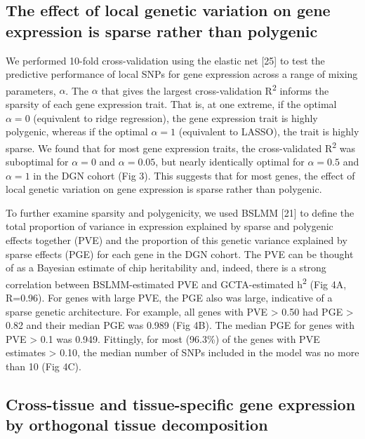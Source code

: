 \documentclass[]{article}
\begin{document}
\subsection{The effect of local genetic variation on gene expression is
sparse rather than
polygenic}\label{the-effect-of-local-genetic-variation-on-gene-expression-is-sparse-rather-than-polygenic}

We performed 10-fold cross-validation using the elastic net {[}25{]} to
test the predictive performance of local SNPs for gene expression across
a range of mixing parameters, \(\alpha\). The \(\alpha\) that gives the
largest cross-validation R\textsuperscript{2} informs the sparsity of
each gene expression trait. That is, at one extreme, if the optimal
\(\alpha=0\) (equivalent to ridge regression), the gene expression trait
is highly polygenic, whereas if the optimal \(\alpha=1\) (equivalent to
LASSO), the trait is highly sparse. We found that for most gene
expression traits, the cross-validated R\textsuperscript{2} was
suboptimal for \(\alpha=0\) and \(\alpha=0.05\), but nearly identically
optimal for \(\alpha=0.5\) and \(\alpha=1\) in the DGN cohort (Fig 3).
This suggests that for most genes, the effect of local genetic variation
on gene expression is sparse rather than polygenic.

To further examine sparsity and polygenicity, we used BSLMM {[}21{]} to
define the total proportion of variance in expression explained by
sparse and polygenic effects together (PVE) and the proportion of this
genetic variance explained by sparse effects (PGE) for each gene in the
DGN cohort. The PVE can be thought of as a Bayesian estimate of chip
heritability and, indeed, there is a strong correlation between
BSLMM-estimated PVE and GCTA-estimated h\textsuperscript{2} (Fig 4A,
R=0.96). For genes with large PVE, the PGE also was large, indicative of
a sparse genetic architecture. For example, all genes with PVE
\textgreater{} 0.50 had PGE \textgreater{} 0.82 and their median PGE was
0.989 (Fig 4B). The median PGE for genes with PVE \textgreater{} 0.1 was
0.949. Fittingly, for most (96.3\%) of the genes with PVE estimates
\textgreater{} 0.10, the median number of SNPs included in the model was
no more than 10 (Fig 4C).

\subsection{Cross-tissue and tissue-specific gene expression by
orthogonal tissue
decomposition}\label{cross-tissue-and-tissue-specific-gene-expression-by-orthogonal-tissue-decomposition}
\end{document}
